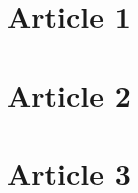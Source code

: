 \documentclass[
11pt, %
french, %
singlespacing, %
headsepline, %
]{MastersDoctoralThesis} %
\begin{document}

\printbibliography[heading=bibintoc]

%
%
%



\appendix %


\chapter{Article 1}


\chapter{Article 2}


\chapter{Article 3}










%
%

\end{document}
